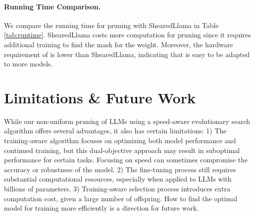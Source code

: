 \paragraph{Running Time Comparison.} We compare the running time for pruning with ShearedLlama in Table \ref{tab:runtime}. ShearedLlama costs more computation for pruning since it requires additional training to find the mask for the weight. Moreover, the hardware requirement of \sysname is lower than ShearedLlama, indicating that \sysname is easy to be adapted to more models.  
\begin{table}[h]
    \centering
    \caption{Running Time Comparison with ShearedLlama and \sysname. \sysname costs less computation compared with ShearedLlama.}
    \label{tab:runtime}
\end{table}
\section{Limitations \& Future Work }

While our non-uniform pruning of LLMs using a speed-aware evolutionary search algorithm offers several advantages, it also has certain limitations: 1) The training-aware algorithm focuses on optimizing both model performance and continued training, but this dual-objective approach may result in suboptimal performance for certain tasks. Focusing on speed can sometimes compromise the accuracy or robustness of the model. 2) The fine-tuning process still requires substantial computational resources, especially when applied to LLMs with billions of parameters. 3) Training-aware selection process introduces extra computation cost, given a large number of offspring. How to find the optimal model for training more efficiently is a direction for future work. 

